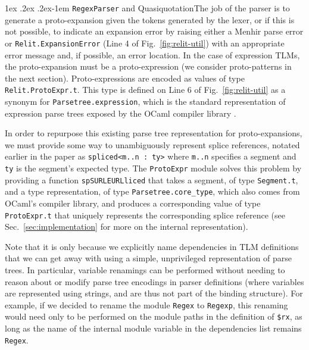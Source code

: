 \documentclass[acmsmall]{acmart}
\makeatletter
\renewcommand{\subsubsection}{%
  \@startsection{subsubsection}{3}%
  {\z@}{1ex \@plus .2ex \@minus .2ex}{-1em}%
  {\normalfont\normalsize\bfseries}%
}
\newcommand{\li}[1]{\lstinline[basicstyle=\ttfamily\fontsize{9pt}{1em}\selectfont]{#1}}
\makeatother
\begin{document}
\subsubsection{\li{RegexParser} and Quasiquotation}\label{sec:regexparser}The job of the parser is to generate a proto-expansion given the tokens generated by the lexer, or if this is not possible, to indicate an expansion error by raising either a Menhir parse error or \li{Relit.ExpansionError} (Line 4 of Fig.~\ref{fig:relit-util}) with an appropriate error message and, if possible, an error location. In the case of expression TLMs, the proto-expansion must be a proto-expression (we consider proto-patterns in the next section). Proto-expressions are encoded as values of type \li{Relit.ProtoExpr.t}. This type is defined on Line 6 of Fig.~\ref{fig:relit-util} as a synonym for \li{Parsetree.expression}, which is the standard representation of expression parse trees exposed by the OCaml compiler library \cite{ocaml-manual}.%

In order to repurpose this existing parse tree representation for proto-expansions, we must provide some way to unambiguously represent splice references, notated earlier in the paper as \li{spliced<m..n : ty>} where \li{m..n} specifies a segment and \li{ty} is the segment's expected type. The \li{ProtoExpr} module solves this problem by providing a function \li{spSURLEURLliced} that takes a segment, of type \li{Segment.t}, and a type representation, of type \li{Parsetree.core_type}, which also comes from OCaml's compiler library, and produces a corresponding value of type \li{ProtoExpr.t} that uniquely represents the corresponding splice reference (see Sec.~\ref{sec:implementation} for more on the internal representation).

Note that it is only because we explicitly name dependencies in TLM definitions that we can get away with using a simple, unprivileged representation of parse trees. In particular, 
variable renamings can be performed without needing to reason about or modify parse tree encodings in parser definitions (where variables are represented using strings, and are thus not part of the binding structure). For example, if we decided to rename the module \li{Regex} to \li{Regexp}, this renaming would need only to be performed on the module paths in the definition of \li{$rx}, as long as the name of the internal module variable in the dependencies list remains \li{Regex}. 
\end{document}
